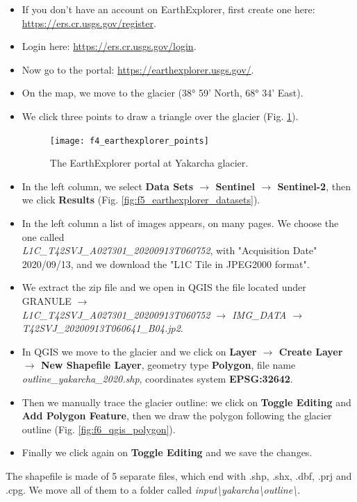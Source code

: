 \documentclass[15pt]{extarticle}
\begin{document}
\begin{itemize}
    \item If you don't have an account on EarthExplorer, first create one here: \href{https://ers.cr.usgs.gov/register}{https://ers.cr.usgs.gov/register}.
    \item Login here: \href{https://ers.cr.usgs.gov/login}{https://ers.cr.usgs.gov/login}.
    \item Now go to the portal: \href{https://earthexplorer.usgs.gov/}{https://earthexplorer.usgs.gov/}.
    \item On the map, we move to the glacier (38° 59' North, 68° 34' East).
    \item We click three points to draw a triangle over the glacier (Fig. \ref{fig:f4_earthexplorer_points}).
    
    \begin{figure}[h!]
    \centering
    \texttt{[image: f4\_earthexplorer\_points]}
    \caption{The EarthExplorer portal at Yakarcha glacier.}
    \label{fig:f4_earthexplorer_points}
    \end{figure}
    
    \item In the left column, we select \textbf{Data Sets $\rightarrow$ Sentinel $\rightarrow$ Sentinel-2}, then we click \textbf{Results} (Fig. \ref{fig:f5_earthexplorer_datasets}).
    \item In the left column a list of images appears, on many pages. We choose the one called\\ \textit{L1C\_T42SVJ\_A027301\_20200913T060752}, with "Acquisition Date" 2020/09/13, and we download the "L1C Tile in JPEG2000 format".
    \item We extract the zip file and we open in QGIS the file located under GRANULE \textit{$\rightarrow$ \\ L1C\_T42SVJ\_A027301\_20200913T060752 $\rightarrow$ IMG\_DATA $\rightarrow$ T42SVJ\_20200913T060641\_B04.jp2}.
    \item In QGIS we move to the glacier and we click on \textbf{Layer $\rightarrow$ Create Layer $\rightarrow$ New Shapefile Layer}, geometry type \textbf{Polygon}, file name \textit{outline\_yakarcha\_2020.shp}, coordinates system \textbf{EPSG:32642}.
    \item Then we manually trace the glacier outline: we click on \textbf{Toggle Editing} and \textbf{Add Polygon Feature}, then we draw the polygon following the glacier outline (Fig. \ref{fig:f6_qgis_polygon}).
    \item Finally we click again on \textbf{Toggle Editing} and we save the changes.
\end{itemize}
The shapefile is made of 5 separate files, which end with .shp, .shx, .dbf, .prj and .cpg. We move all of them to a folder called \textit{input\textbackslash yakarcha\textbackslash outline\textbackslash}.
\end{document}
